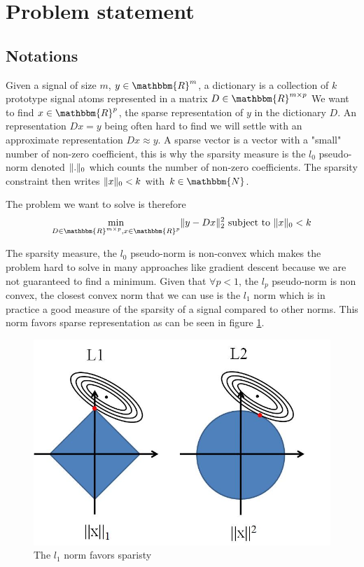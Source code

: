 \documentclass[a4paper,11pt]{article}
\newcommand{\RR}{\mathbbm{R}} %
\DeclarePairedDelimiter\norm{\lVert}{\rVert} %
\begin{document}

\section{Problem statement}
\subsection{Notations}
Given a signal of size $m$, \textbf{$y \in \RR^m$}, a dictionary is a collection of $k$ prototype signal atoms represented in a matrix $D \in \RR^{m \times p}$
We want to find $x \in \RR^p$, the sparse representation of $y$ in the dictionary $D$.
An representation $D x = y$ being often hard to find we will settle with an approximate representation $ D x \approx y$.
A sparse vector is a vector with a "small" number of non-zero coefficient, this is why the sparsity measure is the $l_0$ pseudo-norm denoted $\norm{.}_0$ which counts the number of non-zero coefficients.
The sparsity constraint then writes $\norm{x}_0<k$ with $k \in \mathbbm{N}$.

The problem we want to solve is therefore
$$\min\limits_{D \in \RR^{m \times p}, x \in \RR^p} \norm{y - Dx}_2^2  \text{  subject to  } \norm{x}_0<k$$


The sparsity measure, the $l_0$ pseudo-norm is non-convex which makes the problem hard to solve in many approaches like gradient descent because we are not guaranteed to find a minimum.
Given that $\forall p <1$, the $l_p$ pseudo-norm is non convex, the closest convex norm that we can use is the $l_1$ norm which is in practice a good measure of the sparsity of a signal compared to other norms.
This norm favors sparse representation as can be seen in figure \ref{l1l2_norm}.

\begin{figure}[!htbp]
\centering
  \includegraphics[width=0.5\linewidth]{l1l2_norm.jpg}
  \caption{The $l_1$ norm favors sparisty}
  \label{l1l2_norm}
\end{figure}
\end{document}
